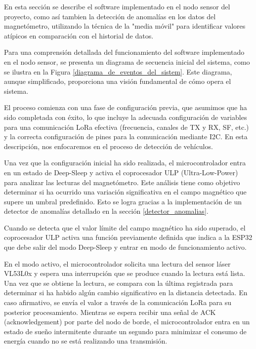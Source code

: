 En esta sección se describe el software implementado en el nodo sensor del proyecto, como así tambien la detección de anomalías en los datos del magnetómetro, utilizando la técnica de la "media móvil" para identificar valores atípicos en comparación con el historial de datos.


Para una comprensión detallada del funcionamiento del software implementado en el nodo sensor, se presenta un diagrama de secuencia inicial del sistema, como se ilustra en la Figura \ref{diagrama_de_eventos_del_sistem}. Este diagrama, aunque simplificado, proporciona una visión fundamental de cómo opera el sistema.



El proceso comienza con una fase de configuración previa, que asumimos que ha sido completada con éxito, lo que incluye la adecuada configuración de variables para una comunicación LoRa efectiva (frecuencia, canales de TX y RX, SF, etc.) y la correcta configuración de pines para la comunicación mediante I2C. En esta descripción, nos enfocaremos en el proceso de detección de vehículos.


Una vez que la configuración inicial ha sido realizada, el microcontrolador entra en un estado de Deep-Sleep y activa el coprocesador ULP (Ultra-Low-Power) para analizar las lecturas del magnetómetro. Este análisis tiene como objetivo determinar si ha ocurrido una variación significativa en el campo magnético que supere un umbral predefinido. Esto se logra gracias a la implementación de un detector de anomalías detallado en la sección \ref{detector_anomalias}.



Cuando se detecta que el valor límite del campo magnético ha sido superado, el coprocesador ULP activa una función previamente definida que indica a la ESP32 que debe salir del modo Deep-Sleep y entrar en modo de funcionamiento activo.

En el modo activo, el microcontrolador solicita una lectura del sensor láser VL53L0x y espera una interrupción que se produce cuando la lectura está lista. Una vez que se obtiene la lectura, se compara con la última registrada para determinar si ha habido algún cambio significativo en la distancia detectada. En caso afirmativo, se envía el valor a través de la comunicación LoRa para su posterior procesamiento. Mientras se espera recibir una señal de ACK (acknowledgement) por parte del nodo de borde, el microcontrolador entra en un estado de sueño intermitente durante un segundo para minimizar el consumo de energía cuando no se está realizando una transmisión.

